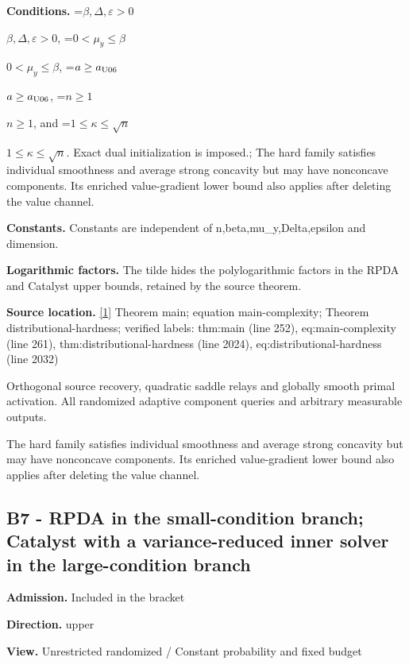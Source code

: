 \documentclass[10pt,a4paper]{article}
\newcommand{\AtlasMath}[1]{\par\begingroup\centering\setbox0=\hbox{$\displaystyle #1$}\ifdim\wd0>1.4\linewidth\typeout{ATLAS WIDE FORMULA: \the\wd0}\fi\ifdim\wd0>\linewidth\resizebox{\linewidth}{!}{\box0}\else\box0\fi\par\endgroup}
\newcommand{\AtlasInlineMath}[1]{\begingroup\setbox0=\hbox{$#1$}\ifdim\wd0>.4\linewidth\endgroup\AtlasMath{#1}\else\endgroup$#1$\fi}
\begin{document}
\textbf{Conditions.} \AtlasInlineMath{\beta,\Delta,\varepsilon>0}, \AtlasInlineMath{0<\mu_y\le\beta}, \AtlasInlineMath{a\ge a_{\rm U06}}, \AtlasInlineMath{n\ge1}, and \AtlasInlineMath{1\le\kappa\le\sqrt n}. Exact dual initialization is imposed.; The hard family satisfies individual smoothness and average strong concavity but may have nonconcave components. Its enriched value-gradient lower bound also applies after deleting the value channel.



\textbf{Constants.} Constants are independent of n,beta,mu\_y,Delta,epsilon and dimension.



\textbf{Logarithmic factors.} The tilde hides the polylogarithmic factors in the RPDA and Catalyst upper bounds, retained by the source theorem.



\textbf{Source location.} \href{https://github.com/WU-Wendao/Colombo/blob/main/colombo_sensorium/Complexity_altas/data/sources/colombo/U06/manuscript.pdf}{[1]} Theorem main; equation main-complexity; Theorem distributional-hardness; verified labels: thm:main (line 252), eq:main-complexity (line 261), thm:distributional-hardness (line 2024), eq:distributional-hardness (line 2032)



Orthogonal source recovery, quadratic saddle relays and globally smooth primal activation. All randomized adaptive component queries and arbitrary measurable outputs.



The hard family satisfies individual smoothness and average strong concavity but may have nonconcave components. Its enriched value-gradient lower bound also applies after deleting the value channel.



\subsection{B7 - RPDA in the small-condition branch; Catalyst with a variance-reduced inner solver in the large-condition branch}


\textbf{Admission.} Included in the bracket



\textbf{Direction.} upper



\textbf{View.} Unrestricted randomized / Constant probability and fixed budget
\end{document}
